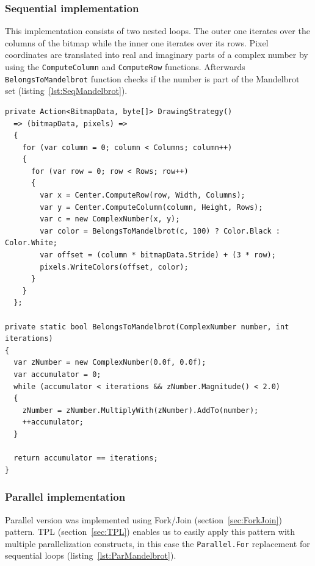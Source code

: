 \pagebreak
\subsubsection{Sequential implementation}
This implementation consists of two nested loops. The outer one iterates over the columns of the bitmap while the inner one iterates over its rows. 
Pixel coordinates are translated into real and imaginary parts of a complex number by using the \texttt{ComputeColumn} and \texttt{ComputeRow} functions. Afterwards \texttt{BelongsToMandelbrot} function checks if the number is part of the Mandelbrot set (listing~\ref{lst:SeqMandelbrot}).

\begin{lstlisting}[style=sharpcstyle, caption={Sequential Mandelbrot algorithm}, label={lst:SeqMandelbrot},
numbers=none, xleftmargin=0pt,framexleftmargin=0pt,framexrightmargin=0pt,framexbottommargin=0pt]
private Action<BitmapData, byte[]> DrawingStrategy()
  => (bitmapData, pixels) =>
  {
    for (var column = 0; column < Columns; column++) 
    {
      for (var row = 0; row < Rows; row++) 
      {
        var x = Center.ComputeRow(row, Width, Columns); 
        var y = Center.ComputeColumn(column, Height, Rows); 
        var c = new ComplexNumber(x, y);
        var color = BelongsToMandelbrot(c, 100) ? Color.Black : Color.White; 
        var offset = (column * bitmapData.Stride) + (3 * row);
        pixels.WriteColors(offset, color);
      }
    }
  };

private static bool BelongsToMandelbrot(ComplexNumber number, int iterations)
{
  var zNumber = new ComplexNumber(0.0f, 0.0f);
  var accumulator = 0;
  while (accumulator < iterations && zNumber.Magnitude() < 2.0)
  {
    zNumber = zNumber.MultiplyWith(zNumber).AddTo(number);
    ++accumulator;
  }

  return accumulator == iterations;
}
\end{lstlisting}

\subsubsection{Parallel implementation}
Parallel version was implemented using Fork/Join (section~\ref{sec:ForkJoin}) pattern. TPL (section~\ref{sec:TPL})  enables us to easily apply this pattern with multiple parallelization constructs, in this case the \texttt{Parallel.For} replacement for sequential loops (listing~\ref{lst:ParMandelbrot}).

